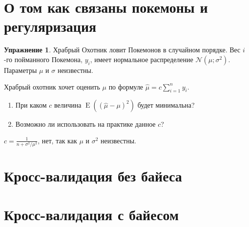 \documentclass[12pt, a4paper, oneside]{extreport}
\DeclareMathOperator{\E}{\mathop{E}}
\def \mN{\mathcal{N}}
\theoremstyle{plain}              %
\theoremstyle{definition}         %
\newtheorem{problem}{\color{myblue} Упражнение}
\begin{document}
\section{О том как связаны покемоны и регуляризация}

\begin{problem}
Храбрый Охотник ловит Покемонов в случайном порядке. Вес $i$-го пойманного Покемона, $y_i$, имеет нормальное распределение $\mN(\mu; \sigma^2)$. Параметры $\mu$ и $\sigma$ неизвестны.

Храбрый охотник хочет оценить $\mu$ по формуле $\hat\mu = c\sum_{i=1}^n y_i$.

\begin{enumerate}
\item При каком $c$ величина $\E((\hat\mu - \mu)^2)$ будет минимальна?
\item Возможно ли использовать на практике данное $c$?
\end{enumerate}
\begin{sol}
  $c=\frac{1}{n + \sigma^2/\mu^2}$, нет, так как $\mu$ и $\sigma^2$ неизвестны.
\end{sol}
\end{problem}



\section{Кросс-валидация без байеса}


\section{Кросс-валидация с байесом} 








% 
\end{document}

